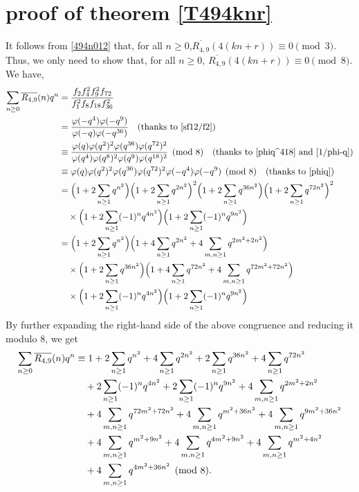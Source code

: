 \documentclass{amsart}
\theoremstyle{definition}
\begin{document}
\section{proof of theorem \ref{T494knr}}
It follows from \eqref{494n012} that, for all $n\geq 0$,$\overline{R_{4,9}}(4(kn+r))\equiv0\pmod{3}$. Thus, we only need to show that, for all $n\geq 0$, $\overline{R_{4,9}}(4(kn+r))\equiv0\pmod{8}$. We have,
\begin{align*} 
\sum_{n\geq 0}\overline{R_{4,9}}(n)q^n&=\frac{f_2f_4^2f_9^2f_{72}}{f_1^2f_{8}f_{18}f_{36}^2} \\
&=\frac{\varphi(-q^4)\varphi(-q^9)}{\varphi(-q)\varphi(-q^{36})} \quad \text{(thanks to \eqref{sf12/f2})}\\
&\equiv \frac{\varphi(q)\varphi(q^2)^2\varphi(q^{36})\varphi(q^{72})^2}{\varphi(q^4)\varphi(q^8)^2\varphi(q^9)\varphi(q^{18})^2}\pmod{8} \quad \text{(thanks to \eqref{phiq^418} and \eqref{1/phi-q})}\\
&\equiv \varphi(q)\varphi(q^2)^2\varphi(q^{36})\varphi(q^{72})^2 \varphi(-q^4)\varphi(-q^9)\pmod{8} \quad \text{(thanks to \eqref{phiq})}\\
&=\Big(1+2\sum_{n\geq1}q^{n^2}\Big)\Big(1+2\sum_{n\geq1}q^{2n^2}\Big)^2\Big(1+2\sum_{n\geq1}q^{36n^2}\Big)\Big(1+2\sum_{n\geq1}q^{72n^2}\Big)^2\\
&\quad \times \Big(1+2\sum_{n\geq1}(-1)^nq^{4n^2}\Big)\Big(1+2\sum_{n\geq1}(-1)^nq^{9n^2}\Big)\\
&=\Big(1+2\sum_{n\geq1}q^{n^2}\Big)\Big(1+4\sum_{n\geq1}q^{2n^2}+4\sum_{m,n\geq1}q^{2m^2+2n^2}\Big) \\
&\quad \times \Big(1+2\sum_{n\geq1}q^{36n^2}\Big)
\Big(1+4\sum_{n\geq1}q^{72n^2}+4\sum_{m,n\geq1}q^{72m^2+72n^2}\Big)\\
&\quad \times \Big(1+2\sum_{n\geq1}(-1)^nq^{4n^2}\Big)\Big(1+2\sum_{n\geq1}(-1)^nq^{9n^2}\Big)\\
\end{align*}
By further expanding the right-hand side of the above congruence and reducing it modulo 8, we get
\begin{align}\label{49nvarphi}
\sum_{n\geq 0}\overline{R_{4,9}}(n)q^n
&\equiv1+2\sum_{n\geq1}q^{n^2}+4\sum_{n\geq1}q^{2n^2}+2\sum_{n\geq1}q^{36n^2}+4\sum_{n\geq1}q^{72n^2}\\
\notag&\quad +2\sum_{n\geq1}(-1)^nq^{4n^2}
 +2\sum_{n\geq1}(-1)^nq^{9n^2}+4\sum_{m,n\geq1}q^{2m^2+2n^2}\\
\notag&\quad+4\sum_{m,n\geq1}q^{72m^2+72n^2}+4\sum_{m,n\geq1}q^{m^2+36n^2}+4\sum_{m,n\geq1}q^{9m^2+36n^2}\\
\notag&\quad+4\sum_{m,n\geq1}q^{m^2+9n^2}+4\sum_{m,n\geq1}q^{4m^2+9n^2}+4\sum_{m,n\geq1}q^{m^2+4n^2}\\
\notag&\quad +4\sum_{m,n\geq1}q^{4m^2+36n^2} \pmod{8}.
\end{align}
\end{document}
